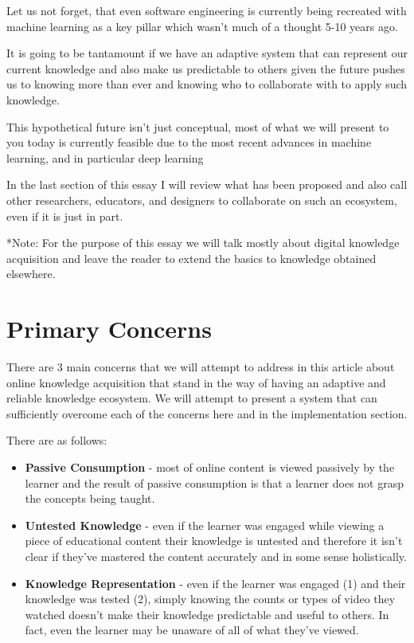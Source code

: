 \documentclass[]{book}
\theoremstyle{definition}
\theoremstyle{definition}
\theoremstyle{definition}
\theoremstyle{remark}
\begin{document}
Let us not forget, that even software engineering is currently being
recreated with machine learning as a key pillar which wasn't much of a
thought 5-10 years ago.

It is going to be tantamount if we have an adaptive system that can
represent our current knowledge and also make us predictable to others
given the future pushes us to knowing more than ever and knowing who to
collaborate with to apply such knowledge.

This hypothetical future isn't just conceptual, most of what we will
present to you today is currently feasible due to the most recent
advances in machine learning, and in particular deep learning

In the last section of this essay I will review what has been proposed
and also call other researchers, educators, and designers to collaborate
on such an ecosystem, even if it is just in part.

*Note: For the purpose of this essay we will talk mostly about digital
knowledge acquisition and leave the reader to extend the basics to
knowledge obtained elsewhere.

\chapter{Primary Concerns}\label{primary-concerns}

There are 3 main concerns that we will attempt to address in this
article about online knowledge acquisition that stand in the way of
having an adaptive and reliable knowledge ecosystem. We will attempt to
present a system that can sufficiently overcome each of the concerns
here and in the implementation section.

There are as follows:

\begin{itemize}
\item
  \textbf{Passive Consumption} - most of online content is viewed
  passively by the learner and the result of passive consumption is that
  a learner does not grasp the concepts being taught.
\item
  \textbf{Untested Knowledge} - even if the learner was engaged while
  viewing a piece of educational content their knowledge is untested and
  therefore it isn't clear if they've mastered the content accurately
  and in some sense holistically.
\item
  \textbf{Knowledge Representation} - even if the learner was engaged
  (1) and their knowledge was tested (2), simply knowing the counts or
  types of video they watched doesn't make their knowledge predictable
  and useful to others. In fact, even the learner may be unaware of all
  of what they've viewed.
\end{itemize}
\end{document}
